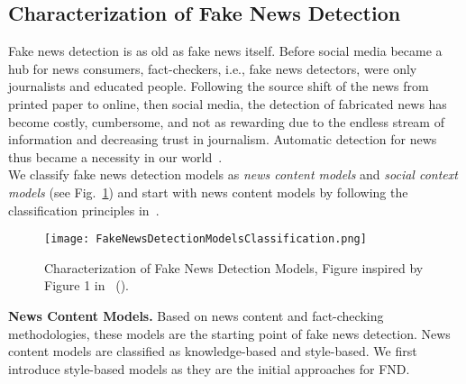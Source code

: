 \subsection{Characterization of Fake News Detection}
\label{subsec:FakeNewsDetection_Characterization}
Fake news detection is as old as fake news itself. Before social media became a hub for news consumers, fact-checkers, i.e., fake news detectors, were only journalists and educated people. Following the source shift of the news from printed paper to online, then social media, the detection of fabricated news has become costly, cumbersome, and not as rewarding due to the endless stream of information and decreasing trust in journalism. Automatic detection for news thus became a necessity in our world~\parencite{NewsInAnOnlineWorld_Chen}.\\
We classify fake news detection models as \emph{news content models} and  \emph{social context models} (see Fig.~\ref{fig:FakeNewsDetectionModelsClassification}) and start with news content models by following the classification principles in~\parencite{FakeNewsDetectionOnSocialMediaADataMiningPerspective_Shu}.\\
\begin{figure}
    \centering
    \texttt{[image: FakeNewsDetectionModelsClassification.png]}
    \caption[Characterization of Fake News Detection Models.]{Characterization of Fake News Detection Models, Figure inspired by Figure 1 in~\citeauthor{FakeNewsDetectionOnSocialMediaADataMiningPerspective_Shu} (\citeyear{FakeNewsDetectionOnSocialMediaADataMiningPerspective_Shu}).}
    \label{fig:FakeNewsDetectionModelsClassification}
\end{figure}
\textbf{News Content Models.} Based on news content and fact-checking methodologies, these models are the starting point of fake news detection. News content models are classified as knowledge-based and style-based. We first introduce style-based models as they are the initial approaches for FND.
